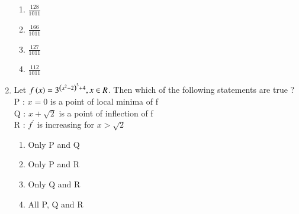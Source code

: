 \documentclass[journal,12pt,onecolumn]{IEEEtran}
\theoremstyle{remark}
\begin{document}
\begin{enumerate}
\begin{enumerate}
    \item $\frac{128}{1011}$
    \item $\frac{166}{1011}$
    \item $\frac{127}{1011}$
    \item $\frac{112}{1011}$
\end{enumerate}
\item Let $f\left(x\right) = 3^{\left(x^2 - 2\right)^3+4}, x \in R$. Then which of the following statements are true ?\\
P : $x = 0$ is a point of local minima of f\\
Q : $x +\sqrt{2}$ is a point of inflection of f\\
R : $f^{\prime}$ is increasing for $x > \sqrt{2}$
\begin{enumerate}
    \item Only P and Q
    \item Only P and R
    \item Only Q and R
    \item All P, Q and R
\end{enumerate}

\end{enumerate}
\end{document}
